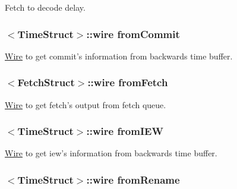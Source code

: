 \label{classDefaultDecode_a689484c3554224a1c1c676e9dde3f653}
Fetch to decode delay. \hypertarget{classDefaultDecode_a0055a92bd94eda21c2641d46ff013dac}{
\subsubsection[{fromCommit}]{$<${\bf TimeStruct}$>$::wire {\bf fromCommit}}}
\label{classDefaultDecode_a0055a92bd94eda21c2641d46ff013dac}
\hyperlink{classWire}{Wire} to get commit's information from backwards time buffer. \hypertarget{classDefaultDecode_a2e3dd009c447d077f19b303b53b52fab}{
\subsubsection[{fromFetch}]{$<${\bf FetchStruct}$>$::wire {\bf fromFetch}}}
\label{classDefaultDecode_a2e3dd009c447d077f19b303b53b52fab}
\hyperlink{classWire}{Wire} to get fetch's output from fetch queue. \hypertarget{classDefaultDecode_a6c9093e88770a58dc8853f49a09bbac8}{
\subsubsection[{fromIEW}]{$<${\bf TimeStruct}$>$::wire {\bf fromIEW}}}
\label{classDefaultDecode_a6c9093e88770a58dc8853f49a09bbac8}
\hyperlink{classWire}{Wire} to get iew's information from backwards time buffer. \hypertarget{classDefaultDecode_ae99c54a9c8f1e218b86afcee348c54fc}{
\subsubsection[{fromRename}]{$<${\bf TimeStruct}$>$::wire {\bf fromRename}}}
